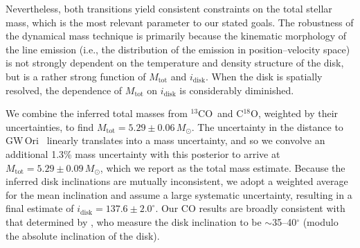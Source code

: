 \documentclass[twocolumn]{aastex61}
\newcommand{\obj}{GW\,Ori}
\newcommand{\thirteen}{${}^{13}$CO}
\newcommand{\eighteen}{C${}^{18}$O}
\begin{document}
Nevertheless, both transitions yield consistent constraints on the total stellar mass, which is the most relevant parameter to our stated goals. The robustness of the dynamical mass technique is primarily because the kinematic morphology of the line emission (i.e., the distribution of the emission in position--velocity space) is not strongly dependent on the temperature and density structure of the disk, but is a rather strong function of $M_\mathrm{tot}$ and $i_\mathrm{disk}$. When the disk is spatially resolved, the dependence of $M_\mathrm{tot}$ on $i_\mathrm{disk}$ is considerably diminished. 

We combine the inferred total masses from \thirteen\ and \eighteen, weighted by their uncertainties, to find $M_\mathrm{tot} = 5.29 \pm 0.06\,M_\odot$. The uncertainty in the distance to \obj\ \citep[$388 \pm 5\,$pc;][]{kounkel17} linearly translates into a mass uncertainty, and so we convolve an additional 1.3\% mass uncertainty with this posterior to arrive at $M_\mathrm{tot} = 5.29 \pm 0.09\,M_\odot$, which we report as the total mass estimate. Because the inferred disk inclinations are mutually inconsistent, we adopt a weighted average for the mean inclination and assume a large systematic uncertainty, resulting in a final estimate of $i_\mathrm{disk} = 137.6 \pm 2.0^\circ$. Our CO results are broadly consistent with that determined by \citet{fang17}, who measure the disk inclination to be $\sim$35--40$^\circ$ (modulo the absolute inclination of the disk).
\end{document}

